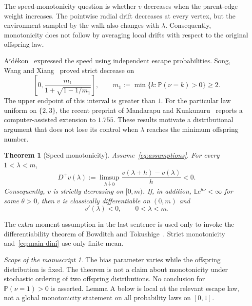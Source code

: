 \documentclass[11pt,a4paper]{article}
\numberwithin{equation}{section}
\theoremstyle{plain}
\newtheorem{theorem}{Theorem}[section]
\theoremstyle{definition}
\theoremstyle{remark}
\newtheorem*{scope}{Scope of the manuscript}
\newcommand{\E}{\mathbb E}
\newcommand{\Prob}{\mathbb P}
\newcommand{\Dini}{D^{+}}
\begin{document}
The speed-monotonicity question is whether $v$ decreases when the
parent-edge weight increases.  The pointwise radial drift decreases at
every vertex, but the environment sampled by the walk also changes with
$\lambda$.  Consequently, monotonicity does not follow by averaging local
drifts with respect to the original offspring law.

A\"id\'ekon~\cite{A14} expressed the speed using independent escape
probabilities.  Song, Wang and Xiang~\cite{SWX25} proved strict decrease on
\begin{equation}\label{eq:knowninterval}
 \left[0,\frac{m_1}{1+\sqrt{1-1/m_1}}\right],
 \qquad m_1:=\min\{k:\Prob(\nu=k)>0\}\ge2.
\end{equation}
The upper endpoint of this interval is greater than $1$.  For the
particular law uniform on $\{2,3\}$, the recent preprint of Mandarapu and
Kunkunuru~\cite{MK26} reports a computer-assisted extension to $1.755$.
These results motivate a distributional argument that does not lose its
control when $\lambda$ reaches the minimum offspring number.

\begin{theorem}[Speed monotonicity]\label{thm:main}
Assume~\eqref{eq:assumptions}.  For every $1<\lambda<m$,
\begin{equation}\label{eq:main-dini}
 \Dini v(\lambda)
 :=\limsup_{h\downarrow0}\frac{v(\lambda+h)-v(\lambda)}{h}<0.
\end{equation}
Consequently, $v$ is strictly decreasing on $[0,m)$.
If, in addition, $\E e^{\theta\nu}<\infty$ for some $\theta>0$, then $v$ is
classically differentiable on $(0,m)$ and
\begin{equation}\label{eq:main-derivative}
 v'(\lambda)<0,\qquad 0<\lambda<m.
\end{equation}
\end{theorem}

The extra moment assumption in the last sentence is used only to invoke
the differentiability theorem of Bowditch and Tokushige~\cite{BT20}.
Strict monotonicity and~\eqref{eq:main-dini} use only finite mean.

\begin{scope}
The bias parameter varies while the offspring distribution is fixed.
The theorem is not a claim about monotonicity under stochastic ordering
of two offspring distributions.  No conclusion for $\Prob(\nu=1)>0$ is
asserted.  Lemma A below is local at the relevant escape law, not a global
monotonicity statement on all probability laws on $[0,1]$.
\end{scope}
\end{document}
